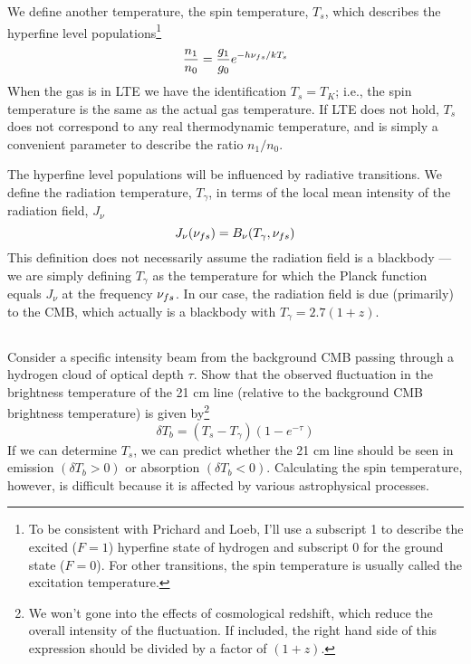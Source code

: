 \documentclass[11pt]{article}
\begin{document}
We define another temperature, the spin temperature, $T_s$, which describes the
hyperfine level populations\footnote{To be consistent with Prichard and Loeb,
I'll use a subscript 1 to describe the excited ($F=1$) hyperfine state of 
hydrogen and subscript 0 for the ground state ($F=0$). For other transitions, the
spin temperature is usually called the excitation temperature.}
\begin{equation}
\frac{n_1}{n_0}=\frac{g_1}{g_0}e^{-h{\nu_{fs}}/kT_s}
\end{equation}
When the gas is in LTE we have the identification $T_s = T_K$; i.e., the spin
temperature is the same as the actual gas temperature. If LTE does not hold, $T_s$
does not correspond to any real thermodynamic temperature, and is simply a
convenient parameter to describe the ratio $n_1/n_0$.

\def\Tg{{T_\gamma}}
The hyperfine level populations will be influenced by radiative transitions. We
define the radiation temperature, $\Tg$, in terms of the local mean intensity of
the radiation field, $J_\nu$
\begin{equation}
J_\nu(\nufs)=B_\nu(\Tg,\nufs)
\end{equation}
This definition does not necessarily assume the radiation field is a blackbody
--- we are simply defining $\Tg$ as the temperature for which the Planck function
equals $J_\nu$ at the frequency ${\nu_{fs}}$. In our case, the radiation field is due
(primarily) to the CMB, which actually is a blackbody with $\Tg=2.7(1+z)$.

\def\dTb{{\delta T_b}}
\subsection{}
Consider a specific intensity beam from the background CMB passing through a
hydrogen cloud of optical depth $\tau$. Show that the observed fluctuation in
the brightness temperature of the 21 cm line (relative to the background CMB
brightness temperature) is given by\footnote{We won’t gone into the effects of
cosmological redshift, which reduce the overall intensity of the fluctuation.
If included, the right hand side of this expression should be divided by a
factor of $(1 + z)$.}
\begin{equation}
\dTb=(T_s-\Tg)(1-e^{-\tau})
\end{equation}
If we can determine $T_s$, we can predict whether the 21 cm line should be seen
in emission $(\dTb > 0)$ or absorption $(\dTb < 0)$. Calculating the spin
temperature, however, is difficult because it is affected by various
astrophysical processes.
\end{document}
